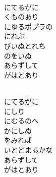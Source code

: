 \documentclass[10pt,b5j]{tarticle} %
\begin{document}
\begin{enumerate}
\begin{minipage}[c]{\blocksize}
    \end{minipage}
    \begin{minipage}[c]{\blocksize}
        
        \vspace{\linespace}
        \item~\\
        にてるがに\\
        くものあり\\
        にゆるポプラの\\
        にれぶ\\
        びいぬとれち\\
        のをいぬ\\
        あらずして\\
        がはとあり
        
    \end{minipage}
    \begin{minipage}[c]{\blocksize}
        
        \vspace{\linespace}
        \item~\\
        にてるがに\\
        にしり\\
        にむるのへ\\
        かにしぬ\\
        をみれば\\
        いとどまるかな\\
        あらずして\\
        がはとあり
    
    \end{minipage}
\end{enumerate} %
\end{document}
